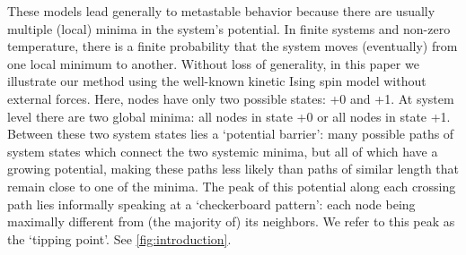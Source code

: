 \documentclass[a4paper, 11pt, twocolumn]{article}
\begin{document}
These models lead generally to metastable behavior because there are usually multiple (local) minima in the system's potential. In finite systems and non-zero temperature, there is a finite probability that the system moves (eventually) from one local minimum to another. Without loss of generality, in this paper we illustrate our method using the well-known kinetic Ising spin model without external forces. Here, nodes have only two possible states: +0 and +1. At system level there are two global minima: all nodes in state +0 or all nodes in state +1. Between these two system states lies a `potential barrier': many possible paths of system states which connect the two systemic minima, but all of which have a growing potential, making these paths less likely than paths of similar length that remain close to one of the minima. The peak of this potential along each crossing path lies informally speaking at a `checkerboard pattern': each node being maximally different from (the majority of) its neighbors. We refer to this peak as the `tipping point'. See \cref{fig:introduction}.

\end{document}
